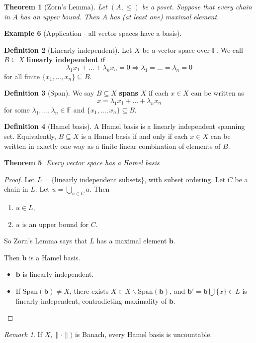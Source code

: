 \documentclass[10pt, oneside, reqno]{amsbook}
\theoremstyle{plain}%
\newtheorem{thm}{Theorem}[section]
\theoremstyle{definition}
\newtheorem{defn}[thm]{Definition}
\newtheorem{exmp}[thm]{Example}
\theoremstyle{remark}
\newtheorem*{rem}{Remark}
\newcommand{\F}{\mathbb{F}}
\begin{document}
\begin{thm}[Zorn's Lemma]
    Let $(A, \leq)$ be a poset.  Suppose that every chain in $A$ has an upper bound.  Then $A$ has (at least one) maximal element.  
\end{thm}

\begin{exmp}[Application - all vector spaces have a basis]
    \begin{defn}[Linearly independent]
        Let $X$ be a vector space over $\F$.  We call $B \subseteq X$ \textbf{linearly independent} if \[
            \lambda_1 x_1 + \dots + \lambda_n x_n = 0 \Rightarrow \lambda_1 = \dots = \lambda_n = 0
        \] for all finite $\{ x_1, \dots, x_n \} \subseteq B$. 
    \end{defn}
    
    \begin{defn}[Span]
        We say $B \subseteq X$ \textbf{spans} $X$ if each $x \in X$ can be written as \[
            x = \lambda_1 x_1 + \dots + \lambda_n x_n
        \] for some $\lambda_1, \dots, \lambda_n \in \F$ and $\{ x_1, \dots, x_n \} \subseteq B$. 
    \end{defn}
    
    \begin{defn}[Hamel basis]
        A Hamel basis is a linearly independent spanning set. Equivalently, $B \subseteq X$ is a Hamel basis if and only if each $x \in X$ can be written in exactly one way as a finite linear combination of elements of $B$.
    \end{defn}
    
    \begin{thm}
        Every vector space has a Hamel basis
    \end{thm}
    
    \begin{proof}
        Let $L = \{ \text{linearly independent subsets} \}$, with subset ordering.  Let $C$ be a chain in $L$.  Let $u = \bigcup_{a \in C} a$.  Then 
        \begin{enumerate}[(1)]
            \item $u \in L$,
            \item $u$ is an upper bound for $C$.
        \end{enumerate}  
        So Zorn's Lemma says that $L$ has a maximal element $\mathbf{b}$.  
        
        Then $\mathbf{b}$ is a Hamel basis. 
        \begin{itemize}
            \item $\mathbf{b}$ is linearly independent.  
            \item If $\text{Span}(\mathbf{b}) \neq X$, there exists $X \in X \backslash \text{Span}(\mathbf{b})$, and $\mathbf{b'} = \mathbf{b} \bigcup \{ x \} \in L$ is linearly independent, contradicting maximality of $\mathbf{b}$.
        \end{itemize}  
    \end{proof}
    
    \begin{rem}
        If $ X, \| \cdot \| )$ is Banach, every Hamel basis is uncountable.
    \end{rem}
\end{exmp}
\end{document}
